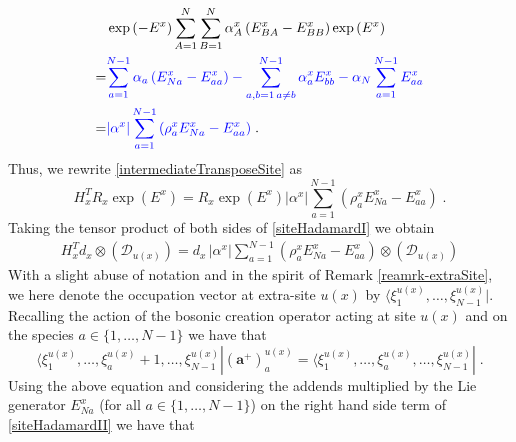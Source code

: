 \documentclass[10pt]{article}
\numberwithin{equation}{section}
\numberwithin{equation}{subsection}
\newcommand{\dt}{\;.}
\newcommand{\fra}[1]{\textcolor[rgb]{0,0,1}{#1}}
\begin{document}
\begin{align}\label{HadTransfBoundary}
&\exp{(-E^{x})}\sum_{A=1}^{N}\sum_{B=1}^{N}\alpha_{A}^{x}\left(E_{B A}^{x}-E_{BB}^{x}\right)\exp{(E^{x})}\nonumber
\\=&
\fra{\sum_{a=1}^{N-1}\alpha_{a}\left(E_{Na}^{x}-E_{aa}^{x}\right)-\sum_{a,b=1\, a\neq b}^{N-1}\alpha_{a}^{x}E_{bb}^{x}-\alpha_{N}\sum_{a=1}^{N-1}E_{aa}^{x}\nonumber}
\\=&
\fra{	|\alpha^{x}|\sum_{a=1}^{N-1}\left(\rho_{a}^{x}E_{Na}^{x}-E_{aa}^{x}\right)}\dt
\end{align}
Thus, we rewrite \eqref{intermediateTransposeSite} as
\begin{equation}\label{siteHadamardI}
H_{x}^{T}R_{x}\exp{(E^{x})}=R_{x}\exp{(E^{x})}|\alpha^{x}|\sum_{a=1}^{N-1}\left(\rho_{a}^{x}E_{Na}^{x}-E_{aa}^{x}\right)\dt
\end{equation}
Taking the tensor product of both sides of  \eqref{siteHadamardI} 
we obtain \fra{
\begin{equation}\label{siteHadamardII}
    \begin{split}
    	H_{x}^{T}d_{x}\otimes\left(\mathcal{D}_{u(x)}%
    	\right)=
 d_{x}\,
|\alpha^{x}|\sum_{a=1}^{N-1}\left(\rho_{a}^{x}E_{Na}^{x}-E_{aa}^{x}\right)\otimes \left(\mathcal{D}_{u(x)}
\right)
    \end{split}
\end{equation}}
{With a slight abuse of notation and in the spirit of Remark \ref{reamrk-extraSite}, we here denote the occupation vector at extra-site $u(x)$ by $\langle \xi_{1}^{u(x)},\ldots,\xi_{N-1}^{u(x)}|$\fra{.}
} \\
\fra{Recalling} the action of the bosonic creation operator acting at site $u(x)$ and on the species $a\in \{1,\ldots,N-1\}$ we have that 
\begin{equation}\label{bosonicKX}
    \langle \xi_{1}^{u(x)},\ldots,\xi_{a}^{u(x)}+1,\ldots,\xi_{N-1}^{u(x)}|(\mathbf{a}^{+})^{u(x)}_{a}=  \langle \xi_{1}^{u(x)},\ldots,\xi_{a}^{u(x)},\ldots,\xi_{N-1}^{u(x)}|\dt
\end{equation}
Using the above equation \fra{and considering the addends multiplied by the Lie generator $E_{Na}^{x}$ (for all $a\in \{1,\ldots,N-1\}$) on the right hand side term of \eqref{siteHadamardII}} we have that 
\end{document}
